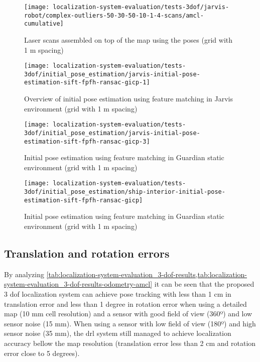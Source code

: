 \begin{figure}[H]
	\centering
	\texttt{[image: localization-system-evaluation/tests-3dof/jarvis-robot/complex-outliers-50-30-50-10-1-4-scans/amcl-cumulative]}
	\caption{Laser scans assembled on top of the map using the  poses (grid with 1 m spacing)}
	\label{fig:localization-system-evaluation_complex-path-with-outliers-50-30-50-10cm-per-sec-velocity-1-4-scans-amcl-cumulative}
\end{figure}


\begin{figure}[H]
	\centering
	\texttt{[image: localization-system-evaluation/tests-3dof/initial\_pose\_estimation/jarvis-initial-pose-estimation-sift-fpfh-ransac-gicp-1]}
	\caption{Overview of initial pose estimation using feature matching in Jarvis environment (grid with 1 m spacing)}
	\label{fig:localization-system-evaluation_jarvis-initial-pose-estimation-sift-fpfh-ransac-gicp-1}
\end{figure}

\begin{figure}[H]
	\centering
	\texttt{[image: localization-system-evaluation/tests-3dof/initial\_pose\_estimation/jarvis-initial-pose-estimation-sift-fpfh-ransac-gicp-3]}
	\caption{Initial pose estimation using feature matching in Guardian static environment (grid with 1 m spacing)}
	\label{fig:localization-system-evaluation_jarvis-initial-pose-estimation-sift-fpfh-ransac-gicp-2}
\end{figure}

\begin{figure}[H]
	\centering
	\texttt{[image: localization-system-evaluation/tests-3dof/initial\_pose\_estimation/ship-interior-initial-pose-estimation-sift-fpfh-ransac-gicp]}
	\caption{Initial pose estimation using feature matching in Guardian static environment (grid with 1 m spacing)}
	\label{fig:localization-system-evaluation_ship-interior-initial-pose-estimation-sift-fpfh-ransac-gicp}
\end{figure}




\subsection{Translation and rotation errors}

By analyzing \cref{tab:localization-system-evaluation_3-dof-results,tab:localization-system-evaluation_3-dof-results-odometry-amcl} it can be seen that the proposed 3 \gls{dof} localization system can achieve pose tracking with less than 1 cm in translation error and less than 1 degree in rotation error when using a detailed map (10 mm cell resolution) and a sensor with good field of view (360º) and low sensor noise (15 mm). When using a sensor with low field of view (180º) and high sensor noise (35 mm), the \gls{drl} system still managed to achieve localization accuracy bellow the map resolution (translation error less than 2 cm and rotation error close to 5 degrees).

